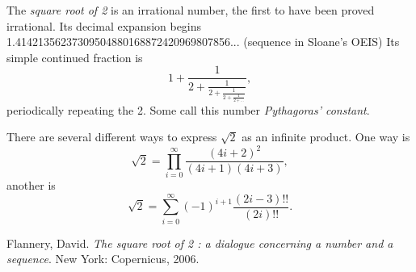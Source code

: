 \documentclass[12pt]{article}
\begin{document}
The \emph{square root of 2} is an irrational number, the first to have been proved irrational. Its decimal expansion begins 1.41421356237309504880168872420969807856... (sequence  in Sloane's OEIS) Its simple continued fraction is $$1 + \frac{1}{2 + \frac{1}{2 + \frac{1}{2 + \frac{1}{2 + \ldots}}}},$$ periodically repeating the 2. Some call this number \emph{Pythagoras' constant}.

There are several different ways to express $\sqrt{2}$ as an infinite product. One way is $$\sqrt{2} = \prod_{i=0}^\infty\frac{(4i+2)^2}{(4i+1)(4i+3)},$$ another is $$\sqrt{2} = \sum_{i=0}^\infty (-1)^{i+1} \frac{(2i-3)!!}{(2i)!!}.$$

\begin{thebibliography}{1}
 Flannery, David. {\it The square root of 2 : a dialogue concerning a number and a sequence}. New York: Copernicus, 2006.
\end{thebibliography}

\end{document}
